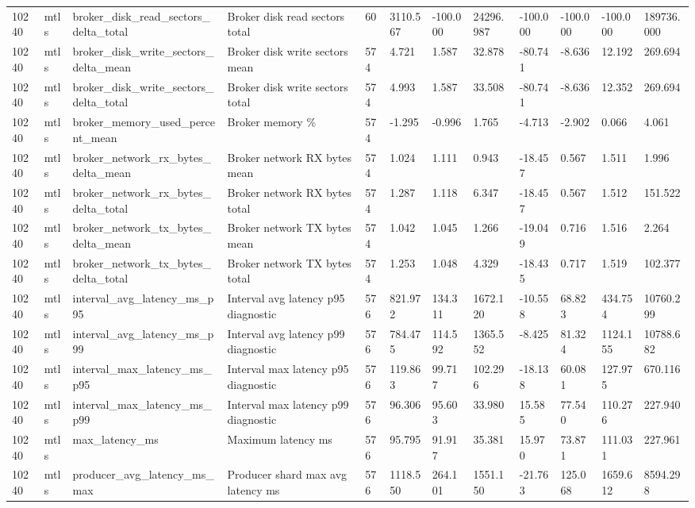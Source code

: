 \begin{longtable}{llllllllllll}
10240 & mtls & broker\_disk\_read\_sectors\_delta\_total & Broker disk read sectors total & 60 & 3110.567 & -100.000 & 24296.987 & -100.000 & -100.000 & -100.000 & 189736.000 \\
10240 & mtls & broker\_disk\_write\_sectors\_delta\_mean & Broker disk write sectors mean & 574 & 4.721 & 1.587 & 32.878 & -80.741 & -8.636 & 12.192 & 269.694 \\
10240 & mtls & broker\_disk\_write\_sectors\_delta\_total & Broker disk write sectors total & 574 & 4.993 & 1.587 & 33.508 & -80.741 & -8.636 & 12.352 & 269.694 \\
10240 & mtls & broker\_memory\_used\_percent\_mean & Broker memory \% & 574 & -1.295 & -0.996 & 1.765 & -4.713 & -2.902 & 0.066 & 4.061 \\
10240 & mtls & broker\_network\_rx\_bytes\_delta\_mean & Broker network RX bytes mean & 574 & 1.024 & 1.111 & 0.943 & -18.457 & 0.567 & 1.511 & 1.996 \\
10240 & mtls & broker\_network\_rx\_bytes\_delta\_total & Broker network RX bytes total & 574 & 1.287 & 1.118 & 6.347 & -18.457 & 0.567 & 1.512 & 151.522 \\
10240 & mtls & broker\_network\_tx\_bytes\_delta\_mean & Broker network TX bytes mean & 574 & 1.042 & 1.045 & 1.266 & -19.049 & 0.716 & 1.516 & 2.264 \\
10240 & mtls & broker\_network\_tx\_bytes\_delta\_total & Broker network TX bytes total & 574 & 1.253 & 1.048 & 4.329 & -18.435 & 0.717 & 1.519 & 102.377 \\
10240 & mtls & interval\_avg\_latency\_ms\_p95 & Interval avg latency p95 diagnostic & 576 & 821.972 & 134.311 & 1672.120 & -10.558 & 68.823 & 434.754 & 10760.299 \\
10240 & mtls & interval\_avg\_latency\_ms\_p99 & Interval avg latency p99 diagnostic & 576 & 784.475 & 114.592 & 1365.552 & -8.425 & 81.324 & 1124.155 & 10788.682 \\
10240 & mtls & interval\_max\_latency\_ms\_p95 & Interval max latency p95 diagnostic & 576 & 119.863 & 99.717 & 102.296 & -18.138 & 60.081 & 127.975 & 670.116 \\
10240 & mtls & interval\_max\_latency\_ms\_p99 & Interval max latency p99 diagnostic & 576 & 96.306 & 95.603 & 33.980 & 15.585 & 77.540 & 110.276 & 227.940 \\
10240 & mtls & max\_latency\_ms & Maximum latency ms & 576 & 95.795 & 91.917 & 35.381 & 15.970 & 73.871 & 111.031 & 227.961 \\
10240 & mtls & producer\_avg\_latency\_ms\_max & Producer shard max avg latency ms & 576 & 1118.550 & 264.101 & 1551.150 & -21.763 & 125.068 & 1659.612 & 8594.298 \\

\end{longtable}
